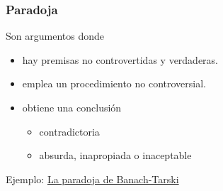 \begin{frame}
\frametitle{Paradoja}

Son argumentos donde
\begin{itemize}
 \item hay premisas no controvertidas y verdaderas.
 \item emplea un procedimiento no controversial.
 \item obtiene una conclusión
 \pause
 \begin{itemize}
  \item contradictoria
  \item absurda, inapropiada o inaceptable
 \end{itemize}
\end{itemize}

\vfill

\pause
Ejemplo: \href{https://es.wikipedia.org/wiki/Paradoja_de_Banach-Tarski}{La paradoja de Banach-Tarski}
\end{frame}
